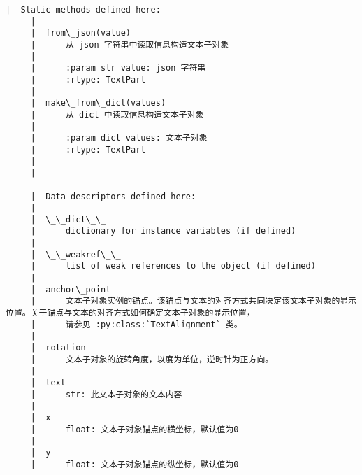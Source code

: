 \documentclass[11pt]{article}
\begin{document}
\begin{Verbatim}[commandchars=\\\{\}]
     |  Static methods defined here:
     |  
     |  from\_json(value)
     |      从 json 字符串中读取信息构造文本子对象
     |      
     |      :param str value: json 字符串
     |      :rtype: TextPart
     |  
     |  make\_from\_dict(values)
     |      从 dict 中读取信息构造文本子对象
     |      
     |      :param dict values: 文本子对象
     |      :rtype: TextPart
     |  
     |  ----------------------------------------------------------------------
     |  Data descriptors defined here:
     |  
     |  \_\_dict\_\_
     |      dictionary for instance variables (if defined)
     |  
     |  \_\_weakref\_\_
     |      list of weak references to the object (if defined)
     |  
     |  anchor\_point
     |      文本子对象实例的锚点。该锚点与文本的对齐方式共同决定该文本子对象的显示位置。关于锚点与文本的对齐方式如何确定文本子对象的显示位置，
     |      请参见 :py:class:`TextAlignment` 类。
     |  
     |  rotation
     |      文本子对象的旋转角度，以度为单位，逆时针为正方向。
     |  
     |  text
     |      str: 此文本子对象的文本内容
     |  
     |  x
     |      float: 文本子对象锚点的横坐标，默认值为0
     |  
     |  y
     |      float: 文本子对象锚点的纵坐标，默认值为0
    

\end{Verbatim}
\end{document}
